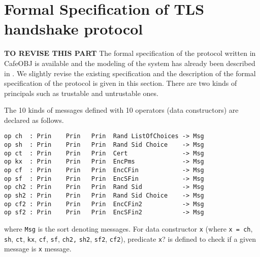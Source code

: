 \documentclass[a4paper,fleqn]{cas-dc}
\begin{document}
\section{Formal Specification of TLS handshake protocol} \label{fstls}
\textbf{TO REVISE THIS PART}
The formal specification of the protocol written in CafeOBJ is available and the modeling of the system has already been described in \cite{1437139}. We slightly revise the existing specification and the description of the formal specification of the protocol is given in this section. There are two kinds of principals such as trustable and untrustable ones. 


The 10 kinds of messages defined with 10 operators (data constructors) are declared as follows.
\begin{small}
		\begin{verbatim}
op ch  : Prin    Prin   Prin  Rand ListOfChoices -> Msg
op sh  : Prin    Prin   Prin  Rand Sid Choice    -> Msg
op ct  : Prin    Prin   Prin  Cert               -> Msg
op kx  : Prin    Prin   Prin  EncPms             -> Msg
op cf  : Prin    Prin   Prin  EncCFin            -> Msg
op sf  : Prin    Prin   Prin  EncSFin            -> Msg
op ch2 : Prin    Prin   Prin  Rand Sid           -> Msg
op sh2 : Prin    Prin   Prin  Rand Sid Choice    -> Msg
op cf2 : Prin    Prin   Prin  EncCFin2           -> Msg
op sf2 : Prin    Prin   Prin  EncSFin2           -> Msg
		\end{verbatim}
	\end{small}
where \verb!Msg! is the sort denoting messages. For data constructor \verb!x! (where \verb!x = ch!, \verb!sh!, \verb!ct!, \verb!kx!, \verb!cf!, \verb!sf!, \verb!ch2,! \verb!sh2!, \verb!sf2!, \verb!cf2!), predicate \verb!x!? is defined to check if a given message is \verb!x! message.
\end{document}
